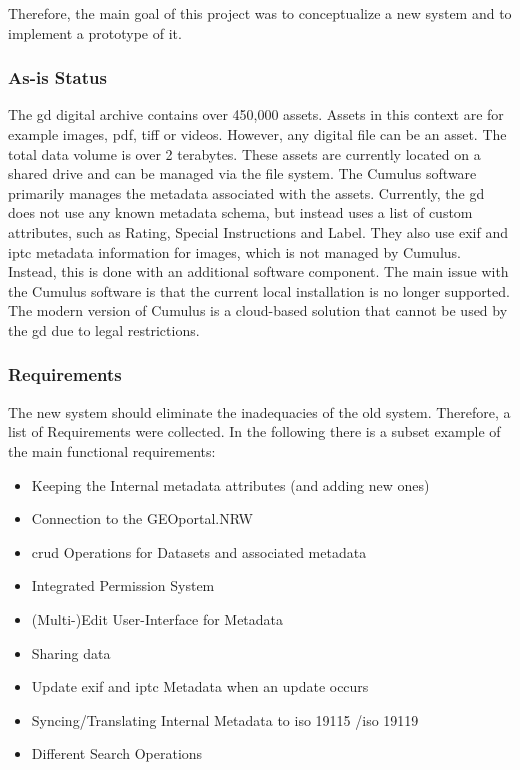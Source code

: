 \documentclass[11pt, titlepage, a4paper]{article}
\begin{document}
Therefore, the main goal of this project was to conceptualize a new system and to implement a prototype of it.
\subsubsection{As-is Status}
The \gls{gd} digital archive contains over 450,000 assets. Assets in this context are for example images, \gls{pdf}, \gls{tiff} or videos. However, any digital file can be an asset. The total data volume is over 2 terabytes.
These assets are currently located on a shared drive and can be managed via the file system. The Cumulus software primarily manages the metadata associated with the assets. Currently, the \gls{gd} does not use any known metadata schema, but instead uses a list of custom attributes, such as Rating, Special Instructions and Label.
They also use \gls{exif} and \gls{iptc} metadata information for images, which is not managed by Cumulus. Instead, this is done with an additional software component. %
The main issue with the Cumulus software is that the current local installation is no longer supported. The modern version of Cumulus is a cloud-based solution that cannot be used by the \gls{gd} due to legal restrictions.

\subsubsection{Requirements}
The new system should eliminate the inadequacies of the old system. Therefore, a list of Requirements were collected. In the following there is a subset example of the main functional requirements:
\begin{itemize}
    \item Keeping the Internal metadata attributes (and adding new ones)
    \item Connection to the GEOportal.NRW
    \item \gls{crud} Operations for Datasets and associated metadata
    \item  Integrated Permission System
    \item (Multi-)Edit User-Interface for Metadata
    \item Sharing data
    \item Update \gls{exif} and \gls{iptc} Metadata when an update occurs
    \item Syncing/Translating Internal Metadata to \gls{iso} 19115 \cite{isoISO1911512014}/\gls{iso} 19119 \cite{isoISO191192016}
    \item Different Search Operations
\end{itemize}
\end{document}
